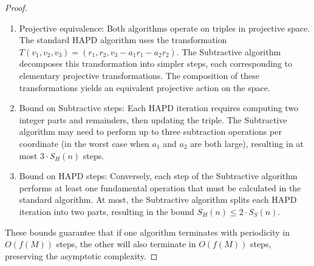 \begin{proof}
\begin{enumerate}
\item Projective equivalence: Both algorithms operate on triples in projective space. The standard HAPD algorithm uses the transformation $T(v_1, v_2, v_3) = (r_1, r_2, v_3 - a_1r_1 - a_2r_2)$. The Subtractive algorithm decomposes this transformation into simpler steps, each corresponding to elementary projective transformations. The composition of these transformations yields an equivalent projective action on the space.

\item Bound on Subtractive steps: Each HAPD iteration requires computing two integer parts and remainders, then updating the triple. The Subtractive algorithm may need to perform up to three subtraction operations per coordinate (in the worst case when $a_1$ and $a_2$ are both large), resulting in at most $3 \cdot S_H(n)$ steps.

\item Bound on HAPD steps: Conversely, each step of the Subtractive algorithm performs at least one fundamental operation that must be calculated in the standard algorithm. At most, the Subtractive algorithm splits each HAPD iteration into two parts, resulting in the bound $S_H(n) \leq 2 \cdot S_S(n)$.
\end{enumerate}

These bounds guarantee that if one algorithm terminates with periodicity in $O(f(M))$ steps, the other will also terminate in $O(f(M))$ steps, preserving the asymptotic complexity.
\end{proof} 